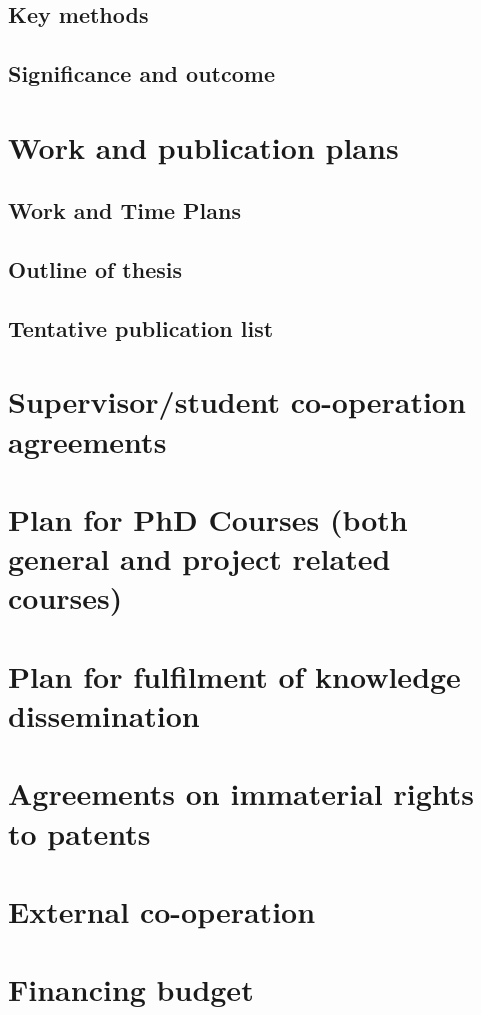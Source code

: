 \subsection{Key methods}
\subsection{Significance and outcome}

\section{Work and publication plans}
\subsection{Work and Time Plans}
\subsection{Outline of thesis}
\subsection{Tentative publication list}

\section{Supervisor/student co-operation agreements}

\section{Plan for PhD Courses (both general and project related courses)}

\section{Plan for fulfilment of knowledge dissemination}

\section{Agreements on immaterial rights to patents}

\section{External co-operation}

\section{Financing budget}